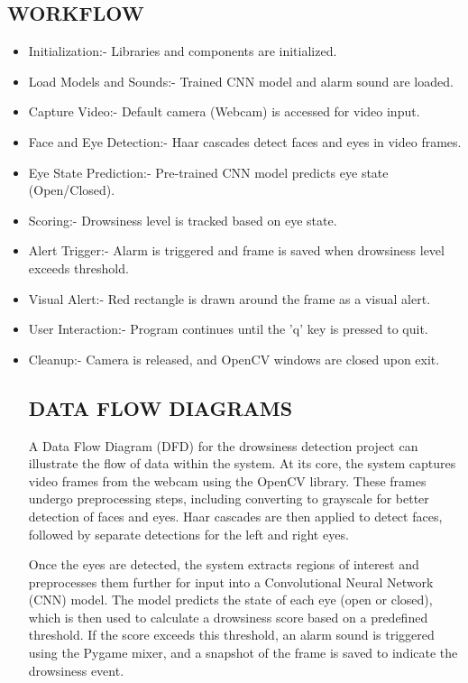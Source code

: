 \documentclass[12pt]{article}
\begin{document}
\subsection{WORKFLOW }

\begin{itemize}
\item Initialization:- Libraries and components are initialized.
   
\item Load Models and Sounds:- Trained CNN model and alarm sound are loaded.
   
\item Capture Video:- Default camera (Webcam) is accessed for video input.
   
\item Face and Eye Detection:- Haar cascades detect faces and eyes in video frames.
   
\item Eye State Prediction:- Pre-trained CNN model predicts eye state (Open/Closed).
   
\item Scoring:- Drowsiness level is tracked based on eye state.
   
\item Alert Trigger:- Alarm is triggered and frame is saved when drowsiness level exceeds threshold.
   
\item Visual Alert:- Red rectangle is drawn around the frame as a visual alert.
   
\item User Interaction:- Program continues until the 'q' key is pressed to quit.
   
\item Cleanup:- Camera is released, and OpenCV windows are closed upon exit.

\subsection{DATA FLOW DIAGRAMS}
A Data Flow Diagram (DFD) for the drowsiness detection project can illustrate the flow of data within the system. At its core, the system captures video frames from the webcam using the OpenCV library. These frames undergo preprocessing steps, including converting to grayscale for better detection of faces and eyes. Haar cascades are then applied to detect faces, followed by separate detections for the left and right eyes. 

Once the eyes are detected, the system extracts regions of interest and preprocesses them further for input into a Convolutional Neural Network (CNN) model. The model predicts the state of each eye (open or closed), which is then used to calculate a drowsiness score based on a predefined threshold. If the score exceeds this threshold, an alarm sound is triggered using the Pygame mixer, and a snapshot of the frame is saved to indicate the drowsiness event.


\end{itemize}
\end{document}
